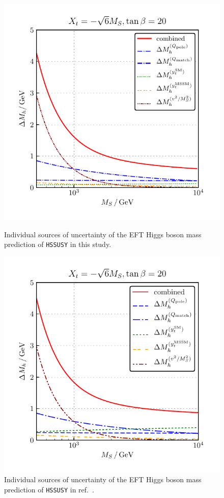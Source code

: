 \documentclass[a4paper,12pt]{book}
\begin{document}
\begin{figure}[h]
\begin{minipage}[t]{0.5\textwidth}
\captionsetup{width=.8\textwidth}
\includegraphics[width=\textwidth]{src/img/DMh_MS_individual.pdf}
\caption{Individual sources of uncertainty of the EFT Higgs boson mass prediction of \texttt{HSSUSY} in this study.}
\label{fig::DMh_individual}
\end{minipage}
\begin{minipage}[t]{0.5\textwidth}
\captionsetup{width=.8\textwidth}
\includegraphics[width=\textwidth]{src/img/DMh_MS_individual_old.pdf}
\caption{Individual sources of uncertainty of the EFT Higgs boson mass prediction of \texttt{HSSUSY} in ref.\ \cite{allanachvoigt}.}
\label{fig::DMh_individual_old}
\end{minipage}
\end{figure}\par
\end{document}
